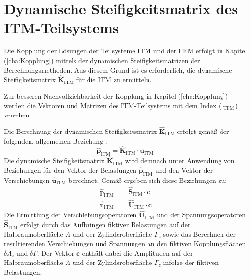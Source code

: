 \section{Dynamische Steifigkeitsmatrix des ITM-Teilsystems}
\label{sec:Steifigkeiten_ITM}

Die Kopplung der Lösungen der Teilsysteme ITM und der FEM erfolgt in Kapitel (\ref{cha:Kopplung}) mittels der dynamischen Steifigkeitsmatrizen der Berechnungsmethoden. Aus diesem Grund ist es erforderlich, die dynamische Steifigkeitsmatrix $\hat{\mathbf K}_{\mathrm{ITM}}$ für die ITM zu ermitteln.

Zur besseren Nachvollziehbarkeit der Kopplung in Kapitel (\ref{cha:Kopplung}) werden die Vektoren und Matrizen des ITM-Teilsystems mit dem Index ($\cdot_{\mathrm{ITM}}$) versehen.

Die Berechnung der dynamischen Steifigkeitsmatrix $\hat{\mathbf K}_{\mathrm{ITM}}$ erfolgt gemäß der folgenden, allgemeinen Beziehung \citep{Kausel2006}:
\begin{equation}\label{eq:itm_system}
	\hat{\mathbf p}_{\mathrm{ITM}} = 
	\hat{\mathbf K}_{\mathrm{ITM}}\cdot\hat{\mathbf u}_{\mathrm{ITM}}\,
\end{equation}
Die dynamische Steifigkeitsmatrix $\hat{\mathbf K}_{\mathrm{ITM}}$ wird demnach unter Anwendung von Beziehungen für den Vektor der Belastungen $\hat{\mathbf p}_{\mathrm{ITM}}$ und den Vektor der Verschiebungen $\hat{\mathbf u}_{\mathrm{ITM}}$ berechnet. Gemäß \cite{Hackenberg2016} ergeben sich diese Beziehungen zu:
\begin{subequations}\label{eq:itm_system_blocks}
	\begin{align}
		\hat{\mathbf p}_{\mathrm{ITM}} &= \hat{\mathbf S}_{\mathrm{ITM}} \cdot \mathbf c \label{eq:itm_system_block_a}\\
		\hat{\mathbf u}_{\mathrm{ITM}} &= \hat{\mathbf U}_{\mathrm{ITM}} \cdot \mathbf c \label{eq:itm_system_block_b}
	\end{align}
\end{subequations}
Die Ermittlung der Verschiebungsoperatoren $\hat{\mathbf U}_{\mathrm{ITM}}$ und der Spannungsoperatoren $\hat{\mathbf S}_{\mathrm{ITM}}$ erfolgt durch das Aufbringen fiktiver Belastungen auf der Halbraumoberfläche $\Lambda$ und der Zylinderoberfläche $\Gamma_z$ sowie das Berechnen der resultierenden Verschiebungen und Spannungen an den fiktiven Kopplungsflächen $\delta \Lambda_z$ und $\delta\Gamma$.
Der Vektor $\mathbf{c}$ enthält dabei die Amplituden auf der Halbraumoberfläche $\Lambda$ und der Zylinderoberfläche $\Gamma_z$ infolge der fiktiven Belastungen. 

